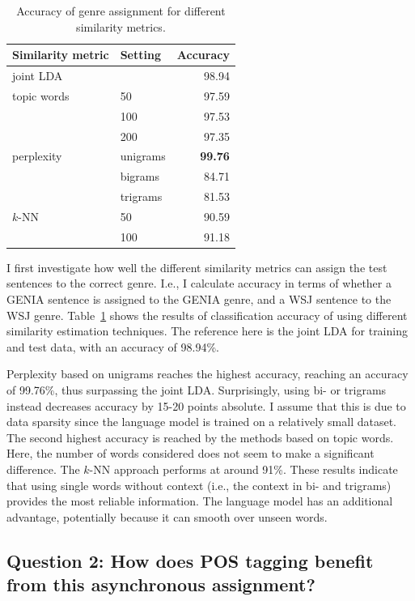 \begin{table}[t!]
\centering
\begin{tabular}{l|l|r|}
Similarity metric & Setting & Accuracy \\ \hline
joint LDA & & 98.94 \\ \hline
topic words & 50 & 97.59 \\ 
 & 100 & 97.53 \\ 
 & 200 & 97.35 \\ \hline
perplexity & unigrams & \textbf{99.76} \\ 
 & bigrams & 84.71 \\  
 & trigrams & 81.53 \\ \hline
$k$-NN & 50 & 90.59 \\ 
 & 100 & 91.18 \\ \hline
\end{tabular}
\caption{Accuracy of genre assignment for different similarity metrics.}
\label{tab:acc:class:simmetr}
\end{table}

I first investigate how well the different similarity metrics can assign the test sentences to the correct genre. I.e., I calculate accuracy in terms of whether a GENIA sentence is assigned to the GENIA genre, and a WSJ sentence to the WSJ genre.
Table~\ref{tab:acc:class:simmetr} shows the results of classification accuracy of using different similarity estimation techniques. The reference here is the joint LDA for training and test data, with an accuracy of 98.94\%. 
 
Perplexity based on unigrams reaches the highest accuracy, reaching an accuracy of 99.76\%, thus surpassing the joint LDA. Surprisingly, using bi- or trigrams instead decreases accuracy by 15-20 points absolute. I assume that this is due to data sparsity since the language model is trained on a relatively small dataset. The second highest accuracy is reached by the methods based on topic words. Here, the number of words considered does not seem to make a significant difference. The $k$-NN approach performs at around 91\%. These results indicate that using single words without context (i.e., the context in bi- and trigrams) provides the most reliable information. The language model has an additional advantage, potentially because it can smooth over unseen words.
  



  
\subsection*{Question 2: How does POS tagging benefit from this asynchronous assignment?}

